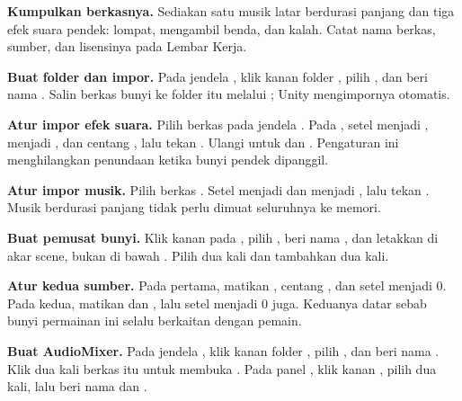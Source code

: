 \begin{langkah}
  \item \textbf{Kumpulkan berkasnya.} Sediakan satu musik latar berdurasi
        panjang dan tiga efek suara pendek: lompat, mengambil benda, dan
        kalah. Catat nama berkas, sumber, dan lisensinya pada Lembar Kerja.

  \item \textbf{Buat folder dan impor.} Pada jendela , klik
        kanan folder , pilih , dan beri
        nama . Salin berkas bunyi ke folder itu melalui
        ; Unity mengimpornya otomatis.

  \item \textbf{Atur impor efek suara.} Pilih berkas  pada
        jendela . Pada , setel
         menjadi ,
         menjadi , dan centang
        , lalu tekan . Ulangi untuk
         dan . Pengaturan ini menghilangkan penundaan
        ketika bunyi pendek dipanggil.

  \item \textbf{Atur impor musik.} Pilih berkas . Setel
         menjadi  dan
         menjadi , lalu tekan
        . Musik berdurasi panjang tidak perlu dimuat seluruhnya ke
        memori.

  \item \textbf{Buat pemusat bunyi.} Klik kanan pada , pilih
        , beri nama , dan letakkan di
        akar scene, bukan di bawah . Pilih
         dua kali dan tambahkan  dua
        kali.

  \item \textbf{Atur kedua sumber.} Pada  pertama, matikan
        , centang , dan setel
         menjadi 0. Pada  kedua, matikan
         dan , lalu setel
         menjadi 0 juga. Keduanya datar sebab bunyi
        permainan ini selalu berkaitan dengan pemain.

  \item \textbf{Buat AudioMixer.} Pada jendela , klik kanan
        folder , pilih , dan
        beri nama . Klik dua kali berkas itu untuk membuka
        . Pada panel , klik
        kanan , pilih  dua kali, lalu beri
        nama  dan .


\end{langkah}
